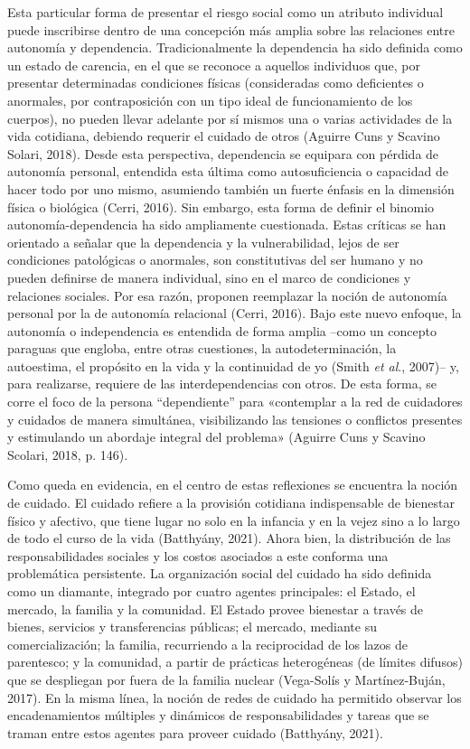 Esta particular forma de presentar el riesgo social como un atributo individual puede inscribirse dentro de una concepción más amplia sobre las relaciones entre autonomía y dependencia. Tradicionalmente la dependencia ha sido definida como un estado de carencia, en el que se reconoce a aquellos individuos que, por presentar determinadas condiciones físicas (consideradas como deficientes o anormales, por contraposición con un tipo ideal de funcionamiento de los cuerpos), no pueden llevar adelante por sí mismos una o varias actividades de la vida cotidiana, debiendo requerir el cuidado de otros (Aguirre Cuns y Scavino Solari, 2018). Desde esta perspectiva, dependencia se equipara con pérdida de autonomía personal, entendida esta última como autosuficiencia o capacidad de hacer todo por uno mismo, asumiendo también un fuerte énfasis en la dimensión física o biológica (Cerri, 2016). Sin embargo, esta forma de definir el binomio autonomía-dependencia ha sido ampliamente cuestionada. Estas críticas se han orientado a señalar que la dependencia y la vulnerabilidad, lejos de ser condiciones patológicas o anormales, son constitutivas del ser humano y no pueden definirse de manera individual, sino en el marco de condiciones y relaciones sociales. Por esa razón, proponen reemplazar la noción de autonomía personal por la de autonomía relacional (Cerri, 2016). Bajo este nuevo enfoque, la autonomía o independencia es entendida de forma amplia --como un concepto paraguas que engloba, entre otras cuestiones, la autodeterminación, la autoestima, el propósito en la vida y la continuidad de yo (Smith \emph{et al}., 2007)-- y, para realizarse, requiere de las interdependencias con otros. De esta forma, se corre el foco de la persona ``dependiente'' para «contemplar a la red de cuidadores y cuidados de manera simultánea, visibilizando las tensiones o conflictos presentes y estimulando un abordaje integral del problema» (Aguirre Cuns y Scavino Scolari, 2018, p. 146).

Como queda en evidencia, en el centro de estas reflexiones se encuentra la noción de cuidado. El cuidado refiere a la provisión cotidiana indispensable de bienestar físico y afectivo, que tiene lugar no solo en la infancia y en la vejez sino a lo largo de todo el curso de la vida (Batthyány, 2021). Ahora bien, la distribución de las responsabilidades sociales y los costos asociados a este conforma una problemática persistente. La organización social del cuidado ha sido definida como un diamante, integrado por cuatro agentes principales: el Estado, el mercado, la familia y la comunidad. El Estado provee bienestar a través de bienes, servicios y transferencias públicas; el mercado, mediante su comercialización; la familia, recurriendo a la reciprocidad de los lazos de parentesco; y la comunidad, a partir de prácticas heterogéneas (de límites difusos) que se despliegan por fuera de la familia nuclear (Vega-Solís y Martínez-Buján, 2017). En la misma línea, la noción de redes de cuidado ha permitido observar los encadenamientos múltiples y dinámicos de responsabilidades y tareas que se traman entre estos agentes para proveer cuidado (Batthyány, 2021).

